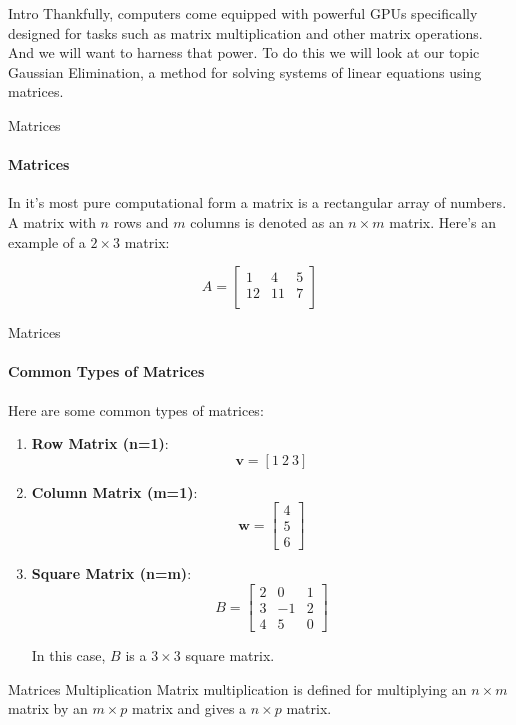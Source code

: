 \documentclass{beamer}
\begin{document}
\begin{frame}{Intro}
Thankfully, computers come equipped with powerful GPUs specifically designed for tasks such as matrix multiplication and other matrix operations. And we will want to harness that power. To do this we will look at our topic Gaussian Elimination, a method for solving systems of linear equations using matrices.
\end{frame}

\begin{frame}{Matrices}
\framesubtitle{Matrices}
In it's most pure computational form a matrix is a rectangular array of numbers. A matrix with \(n\) rows and \(m\) columns is denoted as an \(n \times m\) matrix. Here's an example of a \(2 \times 3\) matrix:

\[
A = 
\begin{bmatrix}
    1 & 4 & 5 \\
    12 & 11 & 7 \\
\end{bmatrix}
\]  
\end{frame}

\begin{frame}{Matrices}
\framesubtitle{Common Types of Matrices}
Here are some common types of matrices:

\begin{enumerate}
    \item \textbf{Row Matrix (n=1)}:
    \[
    \mathbf{v} = [1 \ 2 \ 3]
    \]
    \item \textbf{Column Matrix (m=1)}: 
    \[
    \mathbf{w} =
    \begin{bmatrix}
        4 \\
        5 \\
        6
    \end{bmatrix}
    \]
    
    \item \textbf{Square Matrix (n=m)}: 
    \[
    B =
    \begin{bmatrix}
        2 & 0 & 1 \\
        3 & -1 & 2 \\
        4 & 5 & 0
    \end{bmatrix}
    \]
    
    In this case, \(B\) is a \(3 \times 3\) square matrix.
    
\end{enumerate}
\end{frame}

\begin{frame}{Matrices Multiplication}
Matrix multiplication is defined for multiplying an \(n \times m\) matrix by an \(m \times p\) matrix and gives a  \(n \times p\) matrix.    
\end{frame}
\end{document}
